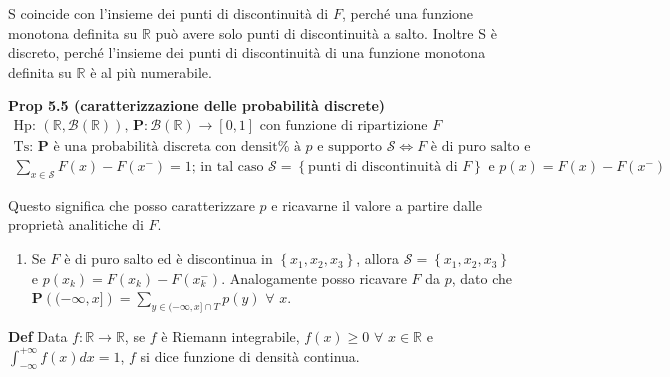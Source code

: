 \documentclass{article}
\begin{document}
\textsc{S} coincide con l'insieme dei punti di discontinuit\`{a} di $F$,
perch\'{e} una funzione monotona definita su $%
\mathbb{R}
$ pu\`{o} avere solo punti di discontinuit\`{a} a salto. Inoltre \textsc{S} 
\`{e} discreto, perch\'{e} l'insieme dei punti di discontinuit\`{a} di una
funzione monotona definita su $%
\mathbb{R}
$ \`{e} al pi\`{u} numerabile.

\textbf{Prop 5.5 (caratterizzazione delle probabilit\`{a} discrete)}%
\begin{gather*}
\text{Hp: }\left( 
\mathbb{R}
,\mathcal{B}\left( 
\mathbb{R}
\right) \right) \text{, }\mathbf{P}:\mathcal{B}\left( 
\mathbb{R}
\right) \rightarrow \left[ 0,1\right] \text{ con funzione di ripartizione }F
\\
\text{Ts: }\mathbf{P}\text{ \`{e} una probabilit\`{a} discreta con densit%
\`{a} }p\text{ e supporto }\mathcal{S}\Longleftrightarrow F\text{ \`{e} di
puro salto e} \\
\sum_{x\in \mathcal{S}}F\left( x\right) -F\left( x^{-}\right) =1\text{; in
tal caso }\mathcal{S}=\left\{ \text{punti di discontinuit\`{a} di }F\right\} 
\text{ e }p\left( x\right) =F\left( x\right) -F\left( x^{-}\right)
\end{gather*}

Questo significa che posso caratterizzare $p$ e ricavarne il valore a
partire dalle propriet\`{a} analitiche di $F$.

\begin{enumerate}
\item Se $F$ \`{e} di puro salto ed \`{e} discontinua in $\left\{
x_{1},x_{2},x_{3}\right\} $, allora $\mathcal{S}=\left\{
x_{1},x_{2},x_{3}\right\} $ e $p\left( x_{k}\right) =F\left( x_{k}\right)
-F\left( x_{k}^{-}\right) $. Analogamente posso ricavare $F$ da $p$, dato
che $\mathbf{P}\left( (-\infty ,x]\right) =\sum_{y\in (-\infty ,x]\cap
T}p\left( y\right) $ $\forall $ $x$.
\end{enumerate}

\textbf{Def} Data $f:%
\mathbb{R}
\rightarrow 
\mathbb{R}
$, se $f$ \`{e} Riemann integrabile, $f\left( x\right) \geq 0$ $\forall $ $%
x\in 
\mathbb{R}
$ e $\int_{-\infty }^{+\infty }f\left( x\right) dx=1$, $f$ si dice funzione
di densit\`{a} continua.
\end{document}
